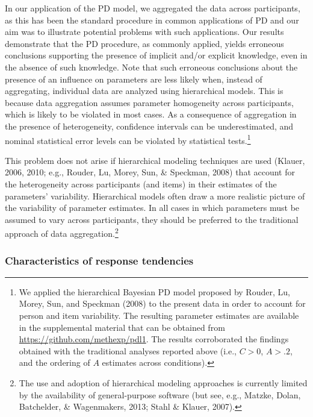 \documentclass[
  english,
  man]{apa6}
\begin{document}
In our application of the PD model, we aggregated the data across participants, as this has been the standard procedure in common applications of PD and our aim was to illustrate potential problems with such applications.
Our results demonstrate that the PD procedure, as commonly applied, yields erroneous conclusions supporting the presence of implicit and/or explicit knowledge, even in the absence of such knowledge.
Note that such erroneous conclusions about the presence of an influence on parameters are less likely when, instead of aggregating, individual data are analyzed using hierarchical models.
This is because data aggregation assumes parameter homogeneity across participants, which is likely to be violated in most cases.
As a consequence of aggregation in the presence of heterogeneity, confidence intervals can be underestimated, and nominal statistical error levels can be violated by statistical tests.\footnote{We applied the hierarchical Bayesian PD model proposed by Rouder, Lu, Morey, Sun, and Speckman (2008) to the present data in order to account for person and item variability.
  The resulting parameter estimates are available in the supplemental material that can be obtained from \url{https://github.com/methexp/pdl1}.
  The results corroborated the findings obtained with the traditional analyses reported above (i.e., \(C>0\), \(A>.2\), and the ordering of \(A\) estimates across conditions).}

This problem does not arise if hierarchical modeling techniques are used (Klauer, 2006, 2010; e.g., Rouder, Lu, Morey, Sun, \& Speckman, 2008) that account for the heterogeneity across participants (and items) in their estimates of the parameters' variability.
Hierarchical models often draw a more realistic picture of the variability of parameter estimates.
In all cases in which parameters must be assumed to vary across participants, they should be preferred to the traditional approach of data aggregation.\footnote{The use and adoption of hierarchical modeling approaches is currently limited by the availability of general-purpose software (but see, e.g., Matzke, Dolan, Batchelder, \& Wagenmakers, 2013; Stahl \& Klauer, 2007).}

\hypertarget{characteristics-of-response-tendencies}{%
\subsubsection{Characteristics of response tendencies}\label{characteristics-of-response-tendencies}}
\end{document}
